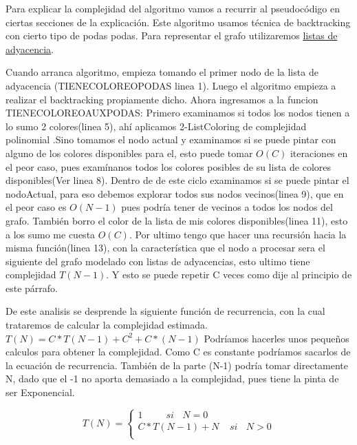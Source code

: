 Para explicar la complejidad del algoritmo vamos a recurrir al pseudocódigo en ciertas secciones de la explicación. Este algoritmo usamos técnica de backtracking con cierto tipo de podas podas.
Para representar el grafo utilizaremos \underline{listas de adyacencia}. 

Cuando arranca algoritmo, empieza tomando el primer nodo de la lista de adyacencia (TIENECOLOREOPODAS linea 1). Luego el algoritmo empieza a realizar el backtracking propiamente dicho.\newline
Ahora ingresamos a la funcion TIENECOLOREOAUXPODAS: \newline 
Primero examinamos si todos los nodos tienen a lo sumo 2 colores(linea 5), ahí aplicamos 2-ListColoring de complejidad polinomial .\newline Sino tomamos el nodo actual y examinamos si se puede pintar con alguno de los colores disponibles para el, esto puede tomar $O(C)$ iteraciones en el peor caso, pues examínanos todos los colores posibles de su lista de colores disponibles(Ver linea 8). Dentro de de este ciclo examinamos si se puede pintar el nodoActual, para eso debemos explorar todos sus nodos vecinos(linea 9), que en el peor caso es $O(N-1)$ pues podría tener de vecinos a todos los nodos del grafo.
También borro el color de la lista de mis colores disponibles(linea 11), esto a los sumo me cuesta $O(C)$.
Por ultimo tengo que hacer una recursión hacia la misma función(linea 13), con la característica que el nodo a procesar sera el siguiente del grafo modelado con listas de adyacencias, esto ultimo tiene complejidad $T(N-1)$. Y esto se puede repetir C veces como dije al principio de este párrafo.\newline

De este analisis se desprende la siguiente función de recurrencia, con la cual trataremos de calcular la complejidad estimada. \newline
$T(N)=C*T(N-1)+C^{2}+C*(N-1)$
Podríamos hacerles unos pequeños calculos para obtener la complejidad. Como C es constante podríamos sacarlos de la ecuación de recurrencia. También de la parte (N-1) podría tomar directamente N, dado que el -1 no aporta demasiado a la complejidad, pues tiene la pinta de ser Exponencial.
 
\begin{equation*}
T(N) = \left\lbrace
\begin{array}{c}
		1 \ \ \ \ \ \ \ \ \ \ \ si \ \ \ \   N = 0 \\
		C*T(N-1)+N  \  \ \ \  \ si \ \ \ \  N>0 \\
\end{array}
\right.
\end{equation*}

